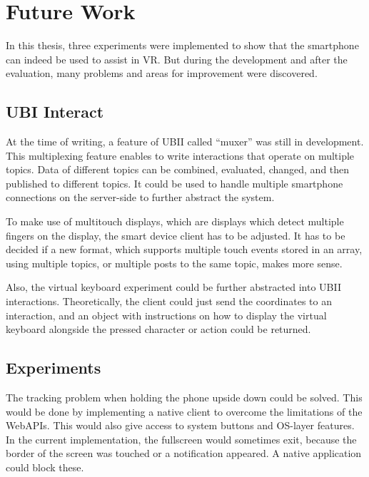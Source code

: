 \chapter{Future Work}\label{chapter:future-work}

In this thesis, three experiments were implemented to show that the smartphone can indeed be used to assist in \ac{VR}. But during the development and after the evaluation, many problems and areas for improvement were discovered. 



\section{UBI Interact}\label{section:fw-ubii}

At the time of writing, a feature of \ac{UBII} called \enquote{muxer} was still in development. This multiplexing feature enables to write interactions that operate on multiple topics. Data of different topics can be combined, evaluated, changed, and then published to different topics. It could be used to handle multiple smartphone connections on the server-side to further abstract the system.

To make use of multitouch displays, which are displays which detect multiple fingers on the display, the smart device client has to be adjusted. It has to be decided if a new format, which supports multiple touch events stored in an array, using multiple topics, or multiple posts to the same topic, makes more sense.

Also, the virtual keyboard experiment could be further abstracted into \ac{UBII} interactions. Theoretically, the client could just send the coordinates to an interaction, and an object with instructions on how to display the virtual keyboard alongside the pressed character or action could be returned.



\section{Experiments}\label{section:fw-experiments}

The tracking problem when holding the phone upside down could be solved. This would be done by implementing a native client to overcome the limitations of the WebAPIs. This would also give access to system buttons and \ac{OS}-layer features. In the current implementation, the fullscreen would sometimes exit, because the border of the screen was touched or a notification appeared. A native application could block these.

